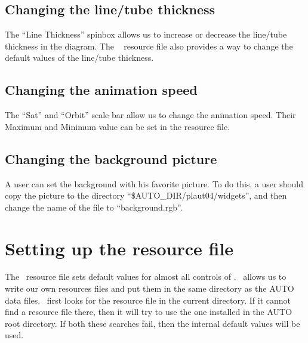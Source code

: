 \subsection{Changing the line/tube thickness}

The ``Line Thickness'' spinbox allows us to increase or decrease the line/tube thickness
in the diagram.  The \PLAUT~ resource file also provides a way to change the default values of the
line/tube thickness.

\subsection{Changing the animation speed}

The ``Sat'' and ``Orbit'' scale bar allow us to change the animation speed.
Their Maximum and Minimum value can be set in the resource file.

\subsection{Changing the background picture}

A user can set the background with his favorite picture.
To do this, a user should copy the picture to the directory ``\$AUTO\_DIR/plaut04/widgets'',
and then change the name of the file to ``background.rgb''.

\section{Setting up the resource file}

The \PLAUT~resource file sets default values for
almost all controls of \PLAUT.
\PLAUT~allows us to write our own resources files and put them in the same directory as the AUTO data files.
\PLAUT~first looks for the resource file in the current directory.
If it cannot find a resource file there, then it will try to use the one installed
in the AUTO root directory. If both these searches fail, then the internal
default values will be used.

